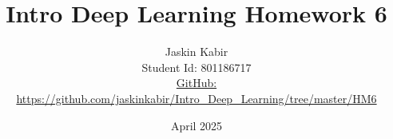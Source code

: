 \centering

\title{\Huge Intro Deep Learning Homework 6}

\author{ \huge
Jaskin Kabir \\
\Large Student Id: 801186717 \\
\Large \href{https://github.com/jaskinkabir/Intro_Deep_Learning/tree/master/HM6}{GitHub:}\\\url{https://github.com/jaskinkabir/Intro_Deep_Learning/tree/master/HM6}
}

\date{April 2025}

\begin{titlingpage}
\maketitle
\end{titlingpage}